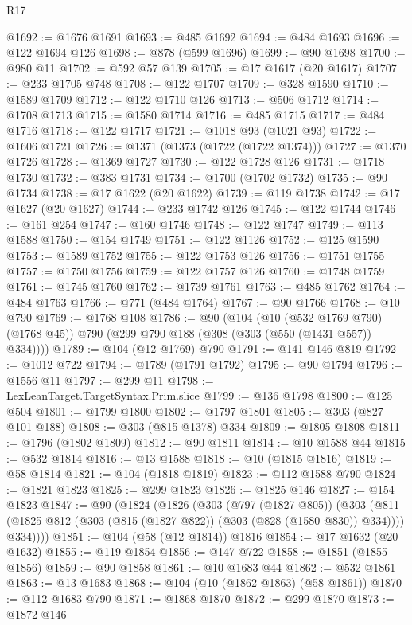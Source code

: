 \begin{lexlean}{R17}
\begin{coremodule}
{{{{{{{{{{{{{{{{{{{{{{{{{{{{{{{{{{{{{{{{{{{{{{{{{{{{{{{{{{{{{{{{{{{{{{{{{{{{{{{{{{{{{{{{{{{{{{{{{{{{{{{{{{{@1692 := @1676 @1691
@1693 := @485 @1692
@1694 := @484 @1693
@1696 := @122 @1694 @126
@1698 := @878 (@599 @1696)
@1699 := @90 @1698
@1700 := @980 @11
@1702 := @592 @57 @139
@1705 := @17 @1617 (@20 @1617)
@1707 := @233 @1705 @748
@1708 := @122 @1707
@1709 := @328 @1590
@1710 := @1589 @1709
@1712 := @122 @1710 @126
@1713 := @506 @1712
@1714 := @1708 @1713
@1715 := @1580 @1714
@1716 := @485 @1715
@1717 := @484 @1716
@1718 := @122 @1717
@1721 := @1018 @93 (@1021 @93)
@1722 := @1606 @1721
@1726 := @1371 (@1373 (@1722 (@1722 @1374)))
@1727 := @1370 @1726
@1728 := @1369 @1727
@1730 := @122 @1728 @126
@1731 := @1718 @1730
@1732 := @383 @1731
@1734 := @1700 (@1702 @1732)
@1735 := @90 @1734
@1738 := @17 @1622 (@20 @1622)
@1739 := @119 @1738
@1742 := @17 @1627 (@20 @1627)
@1744 := @233 @1742 @126
@1745 := @122 @1744
@1746 := @161 @254
@1747 := @160 @1746
@1748 := @122 @1747
@1749 := @113 @1588
@1750 := @154 @1749
@1751 := @122 @1126
@1752 := @125 @1590
@1753 := @1589 @1752
@1755 := @122 @1753 @126
@1756 := @1751 @1755
@1757 := @1750 @1756
@1759 := @122 @1757 @126
@1760 := @1748 @1759
@1761 := @1745 @1760
@1762 := @1739 @1761
@1763 := @485 @1762
@1764 := @484 @1763
@1766 := @771 (@484 @1764)
@1767 := @90 @1766
@1768 := @10 @790
@1769 := @1768 @108
@1786 := @90
    (@104
      (@10 (@532 @1769 @790) (@1768 @45))
      @790
      (@299 @790 @188 (@308 (@303 (@550 (@1431 @557)) @334))))
@1789 := @104 (@12 @1769) @790
@1791 := @141 @146 @819
@1792 := @1012 @722
@1794 := @1789 (@1791 @1792)
@1795 := @90 @1794
@1796 := @1556 @11
@1797 := @299 @11
@1798 := LexLeanTarget.TargetSyntax.Prim.slice
@1799 := @136 @1798
@1800 := @125 @504
@1801 := @1799 @1800
@1802 := @1797 @1801
@1805 := @303 (@827 @101 @188)
@1808 := @303 (@815 @1378) @334
@1809 := @1805 @1808
@1811 := @1796 (@1802 @1809)
@1812 := @90 @1811
@1814 := @10 @1588 @44
@1815 := @532 @1814
@1816 := @13 @1588
@1818 := @10 (@1815 @1816)
@1819 := @58 @1814
@1821 := @104 (@1818 @1819)
@1823 := @112 @1588 @790
@1824 := @1821 @1823
@1825 := @299 @1823
@1826 := @1825 @146
@1827 := @154 @1823
@1847 := @90
    (@1824
      (@1826
        (@303
          (@797 (@1827 @805))
          (@303
            (@811 (@1825 @812 (@303 (@815 (@1827 @822)) (@303 (@828 (@1580 @830)) @334))))
            @334))))
@1851 := @104 (@58 (@12 @1814)) @1816
@1854 := @17 @1632 (@20 @1632)
@1855 := @119 @1854
@1856 := @147 @722
@1858 := @1851 (@1855 @1856)
@1859 := @90 @1858
@1861 := @10 @1683 @44
@1862 := @532 @1861
@1863 := @13 @1683
@1868 := @104 (@10 (@1862 @1863) (@58 @1861))
@1870 := @112 @1683 @790
@1871 := @1868 @1870
@1872 := @299 @1870
@1873 := @1872 @146
}}}}}}}}}}}}}}}}}}}}}}}}}}}}}}}}}}}}}}}}}}}}}}}}}}}}}}}}}}}}}}}}}}}}}}}}}}}}}}}}}}}}}}}}}}}}}}}}}}}}}}}}}}}
\end{coremodule}
\end{lexlean}
